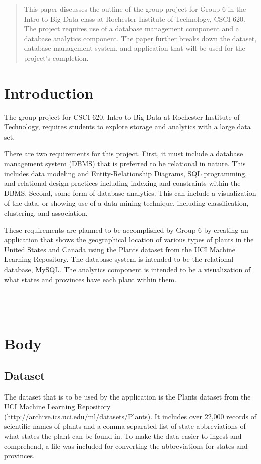 \documentclass{Group6_Phase0}
\begin{document}
\maketitle
\begin{abstract}
This paper discusses the outline of the group project for Group 6 in the Intro to Big Data class at Rochester Institute of Technology, CSCI-620. The project requires use of a database management component and a database analytics component. The paper further breaks down the dataset, database management system, and application that will be used for the project's completion.
\end{abstract}


\section{Introduction}
The group project for CSCI-620, Intro to Big Data at Rochester Institute of Technology, requires students to explore storage and analytics with a large data set.

There are two requirements for this project. First, it must include a database management system (DBMS) that is preferred to be relational in nature. This includes data modeling and Entity-Relationship Diagrams, SQL programming, and relational design practices including indexing and constraints within the DBMS. Second, some form of database analytics. This can include a visualization of the data, or showing use of a data mining technique, including classification, clustering, and association.

These requirements are planned to be accomplished by Group 6 by creating an application that shows the geographical location of various types of plants in the United States and Canada using the Plants dataset from the UCI Machine Learning Repository. The database system is intended to be the relational database, MySQL. The analytics component is intended to be a visualization of what states and provinces have each plant within them.\\\\\\\\

\section{Body}

\subsection{Dataset}
The dataset that is to be used by the application is the Plants dataset from the UCI Machine Learning Repository (http://archive.ics.uci.edu/ml/datasets/Plants). It includes over 22,000 records of scientific names of plants and a comma separated list of state abbreviations of what states the plant can be found in. To make the data easier to ingest and comprehend, a file was included for converting the abbreviations for states and provinces.
\end{document}
